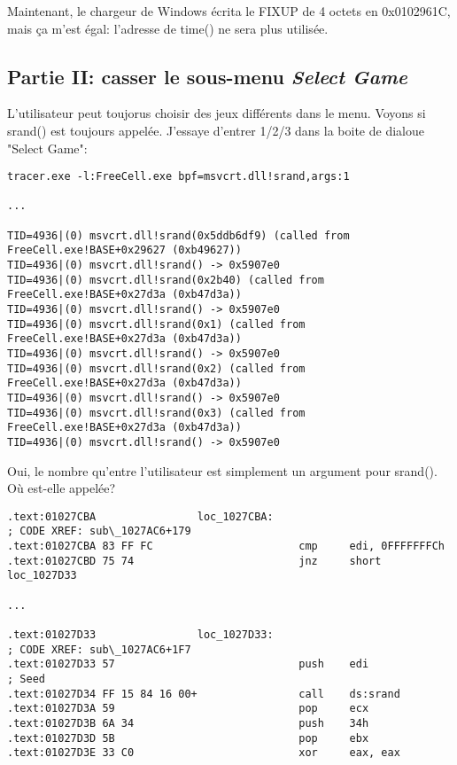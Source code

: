 \begin{figure}[H]
\centering
{}
\end{figure}

Maintenant, le chargeur de Windows écrita le FIXUP de 4 octets en 0x0102961C, mais
ça m'est égal: l'adresse de time() ne sera plus utilisée.

\subsection{Partie II: casser le sous-menu \emph{Select Game}}

L'utilisateur peut toujorus choisir des jeux différents dans le menu.
Voyons si srand() est toujours appelée.
J'essaye d'entrer 1/2/3 dans la boite de dialoue "Select Game":

\begin{lstlisting}
tracer.exe -l:FreeCell.exe bpf=msvcrt.dll!srand,args:1

...

TID=4936|(0) msvcrt.dll!srand(0x5ddb6df9) (called from FreeCell.exe!BASE+0x29627 (0xb49627))
TID=4936|(0) msvcrt.dll!srand() -> 0x5907e0
TID=4936|(0) msvcrt.dll!srand(0x2b40) (called from FreeCell.exe!BASE+0x27d3a (0xb47d3a))
TID=4936|(0) msvcrt.dll!srand() -> 0x5907e0
TID=4936|(0) msvcrt.dll!srand(0x1) (called from FreeCell.exe!BASE+0x27d3a (0xb47d3a))
TID=4936|(0) msvcrt.dll!srand() -> 0x5907e0
TID=4936|(0) msvcrt.dll!srand(0x2) (called from FreeCell.exe!BASE+0x27d3a (0xb47d3a))
TID=4936|(0) msvcrt.dll!srand() -> 0x5907e0
TID=4936|(0) msvcrt.dll!srand(0x3) (called from FreeCell.exe!BASE+0x27d3a (0xb47d3a))
TID=4936|(0) msvcrt.dll!srand() -> 0x5907e0
\end{lstlisting}

Oui, le nombre qu'entre l'utilisateur est simplement un argument pour srand().
Où est-elle appelée?

\begin{lstlisting}
.text:01027CBA                loc_1027CBA:                            ; CODE XREF: sub\_1027AC6+179
.text:01027CBA 83 FF FC                       cmp     edi, 0FFFFFFFCh
.text:01027CBD 75 74                          jnz     short loc_1027D33

...

.text:01027D33                loc_1027D33:                            ; CODE XREF: sub\_1027AC6+1F7
.text:01027D33 57                             push    edi             ; Seed
.text:01027D34 FF 15 84 16 00+                call    ds:srand
.text:01027D3A 59                             pop     ecx
.text:01027D3B 6A 34                          push    34h
.text:01027D3D 5B                             pop     ebx
.text:01027D3E 33 C0                          xor     eax, eax
\end{lstlisting}

